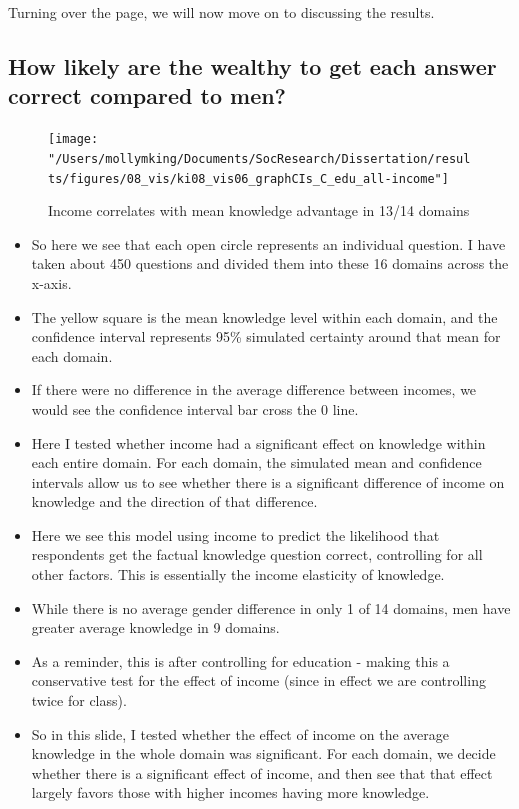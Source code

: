 \documentclass[]{article}
\begin{document}
Turning over the page, we will now move on to discussing the results.

\subsection{How likely are the wealthy to get each answer correct compared to men?}
\begin{figure}[ht]
    \begin{center}
      \texttt{[image: "/Users/mollymking/Documents/SocResearch/Dissertation/results/figures/08\_vis/ki08\_vis06\_graphCIs\_C\_edu\_all-income"]}
      \caption{Income correlates with mean knowledge advantage in 13/14 domains}
    \end{center}
\end{figure}

\begin{itemize}
  \item{So here we see that each open circle represents an individual question. I have taken about 450 questions and divided them into these 16 domains across the x-axis.}
  \item{The yellow square is the mean knowledge level within each domain, and the confidence interval represents 95\% simulated certainty around that mean for each domain.}
  \item{If there were no difference in the average difference between incomes, we would see the confidence interval bar cross the 0 line.}
  \item{Here I tested whether income had a significant effect on knowledge within each entire domain. For each domain, the simulated mean and confidence intervals allow us to see whether there is a significant difference of income on knowledge and the direction of that difference.}
  \item{Here we see this model using income to predict the likelihood that respondents get the factual knowledge question correct, controlling for all other factors. This is essentially the income elasticity of knowledge.}
  \item{While there is no average gender difference in only 1 of 14 domains, men have greater average knowledge in 9 domains.}
  \item{As a reminder, this is after controlling for education - making this a conservative test for the effect of income (since in effect we are controlling twice for class).}
  \item{So in this slide, I tested whether the effect of income on the average knowledge in the whole domain was significant. For each domain, we decide whether there is a significant effect of income, and then see that that effect largely favors those with higher incomes having more knowledge.}
\end{itemize}
\end{document}
